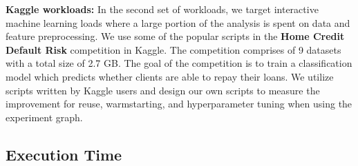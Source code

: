 \textbf{Kaggle workloads:} In the second set of workloads, we target interactive machine learning loads where a large portion of the analysis is spent on data and feature preprocessing.
We use some of the popular scripts in the \textbf{Home Credit Default Risk} competition in Kaggle.
The competition comprises of 9 datasets with a total size of 2.7 GB.
The goal of the competition is to train a classification model which predicts whether clients are able to repay their loans.
We utilize scripts written by Kaggle users and design our own scripts to measure the improvement for reuse, warmstarting, and hyperparameter tuning when using the experiment graph.


\subsection{Execution Time}
